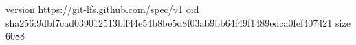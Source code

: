 version https://git-lfs.github.com/spec/v1
oid sha256:9dbf7cad039012513bff44e54b8be5d8f03ab9bb64f49f1489edca0fef407421
size 6088
